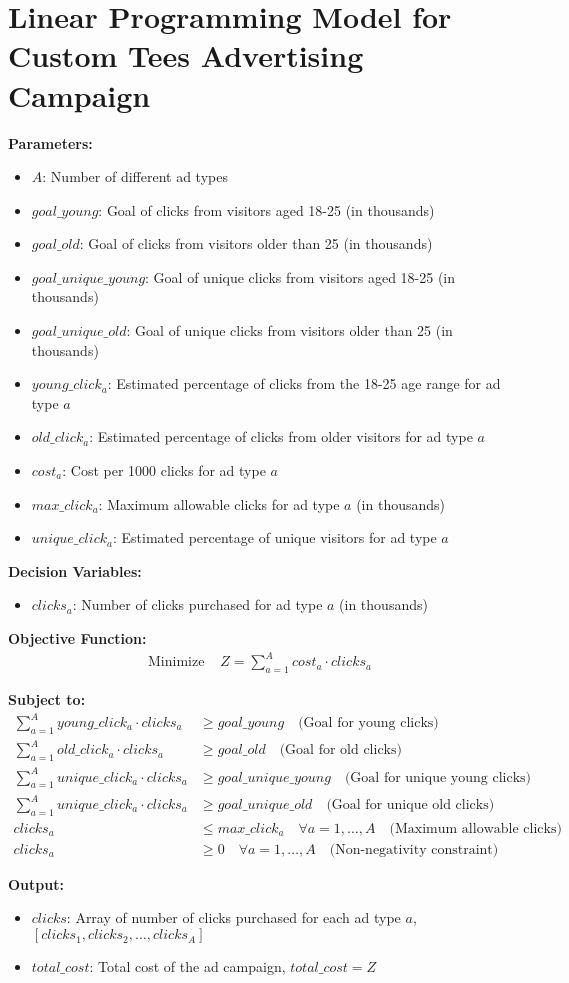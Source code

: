 \documentclass{article}
\begin{document}
\section*{Linear Programming Model for Custom Tees Advertising Campaign}

\textbf{Parameters:}
\begin{itemize}
    \item $A$: Number of different ad types
    \item $goal\_young$: Goal of clicks from visitors aged 18-25 (in thousands)
    \item $goal\_old$: Goal of clicks from visitors older than 25 (in thousands)
    \item $goal\_unique\_young$: Goal of unique clicks from visitors aged 18-25 (in thousands)
    \item $goal\_unique\_old$: Goal of unique clicks from visitors older than 25 (in thousands)
    \item $young\_click_{a}$: Estimated percentage of clicks from the 18-25 age range for ad type $a$
    \item $old\_click_{a}$: Estimated percentage of clicks from older visitors for ad type $a$
    \item $cost_{a}$: Cost per 1000 clicks for ad type $a$
    \item $max\_click_{a}$: Maximum allowable clicks for ad type $a$ (in thousands)
    \item $unique\_click_{a}$: Estimated percentage of unique visitors for ad type $a$
\end{itemize}

\textbf{Decision Variables:}
\begin{itemize}
    \item $clicks_{a}$: Number of clicks purchased for ad type $a$ (in thousands)
\end{itemize}

\textbf{Objective Function:}
\begin{align*}
\text{Minimize } & Z = \sum_{a=1}^{A} cost_{a} \cdot clicks_{a}
\end{align*}

\textbf{Subject to:}
\begin{align*}
\sum_{a=1}^{A} young\_click_{a} \cdot clicks_{a} & \geq goal\_young \quad \text{(Goal for young clicks)} \\
\sum_{a=1}^{A} old\_click_{a} \cdot clicks_{a} & \geq goal\_old \quad \text{(Goal for old clicks)} \\
\sum_{a=1}^{A} unique\_click_{a} \cdot clicks_{a} & \geq goal\_unique\_young \quad \text{(Goal for unique young clicks)} \\
\sum_{a=1}^{A} unique\_click_{a} \cdot clicks_{a} & \geq goal\_unique\_old \quad \text{(Goal for unique old clicks)} \\
clicks_{a} & \leq max\_click_{a} \quad \forall a = 1, \ldots, A \quad \text{(Maximum allowable clicks)} \\
clicks_{a} & \geq 0 \quad \forall a = 1, \ldots, A \quad \text{(Non-negativity constraint)}
\end{align*}

\textbf{Output:}
\begin{itemize}
    \item $clicks$: Array of number of clicks purchased for each ad type $a$, $[clicks_{1}, clicks_{2}, \ldots, clicks_{A}]$
    \item $total\_cost$: Total cost of the ad campaign, $total\_cost = Z$
\end{itemize}
\end{document}
